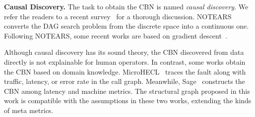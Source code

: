 \noindent
\textbf{Causal Discovery.}
The task to obtain the CBN is named \textit{causal discovery}.
We refer the readers to a recent survey~\cite{Guo:2020} for a thorough discussion.
NOTEARS~\cite{Zheng:2018} converts the DAG search problem from the discrete space into a continuous one.
Following NOTEARS, some recent works are based on gradient descent~\cite{He:2021}.

Although causal discovery has its sound theory, the CBN discovered from data directly is not explainable for human operators.
In contrast, some works obtain the CBN based on domain knowledge.
MicroHECL~\cite{Liu:2021} traces the fault along with traffic, latency, or error rate in the call graph.
Meanwhile, Sage~\cite{Gan:2021} constructs the CBN among latency and machine metrics.
The structural graph proposed in this work is compatible with the assumptions in these two works, extending the kinds of meta metrics.
